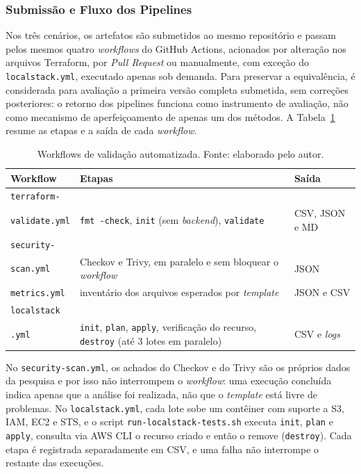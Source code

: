 \subsubsection{Submissão e Fluxo dos Pipelines}

Nos três cenários, os artefatos são submetidos ao mesmo repositório e passam pelos mesmos quatro \textit{workflows} do GitHub Actions, acionados por alteração nos arquivos Terraform, por \textit{Pull Request} ou manualmente, com exceção do \texttt{localstack.yml}, executado apenas sob demanda. Para preservar a equivalência, é considerada para avaliação a primeira versão completa submetida, sem correções posteriores: o retorno dos pipelines funciona como instrumento de avaliação, não como mecanismo de aperfeiçoamento de apenas um dos métodos. A Tabela~\ref{tab:workflows} resume as etapas e a saída de cada \textit{workflow}.

\begin{table}[H]
\centering
\caption{Workflows de validação automatizada. Fonte: elaborado pelo autor.}
\label{tab:workflows}
\small
\begin{tabularx}{\textwidth}{>{\raggedright\arraybackslash}p{2.8cm}|>{\raggedright\arraybackslash}X|>{\raggedright\arraybackslash}p{2.1cm}}
\hline
\textbf{Workflow} & \textbf{Etapas} & \textbf{Saída} \\
\hline
\texttt{terraform-}\\\texttt{validate.yml} & \texttt{fmt -check}, \texttt{init} (sem \textit{backend}), \texttt{validate} & CSV, JSON e MD \\
\hline
\texttt{security-}\\\texttt{scan.yml} & Checkov e Trivy, em paralelo e sem bloquear o \textit{workflow} & JSON \\
\hline
\texttt{metrics.yml} & inventário dos arquivos esperados por \textit{template} & JSON e CSV \\
\hline
\texttt{localstack}\\\texttt{.yml} & \texttt{init}, \texttt{plan}, \texttt{apply}, verificação do recurso, \texttt{destroy} (até 3 lotes em paralelo) & CSV e \textit{logs} \\
\hline
\end{tabularx}
\end{table}

No \texttt{security-scan.yml}, os achados do Checkov e do Trivy são os próprios dados da pesquisa e por isso não interrompem o \textit{workflow}: uma execução concluída indica apenas que a análise foi realizada, não que o \textit{template} está livre de problemas. No \texttt{localstack.yml}, cada lote sobe um contêiner com suporte a S3, IAM, EC2 e STS, e o script \texttt{run-localstack-tests.sh} executa \texttt{init}, \texttt{plan} e \texttt{apply}, consulta via AWS CLI o recurso criado e então o remove (\texttt{destroy}). Cada etapa é registrada separadamente em CSV, e uma falha não interrompe o restante das execuções.

